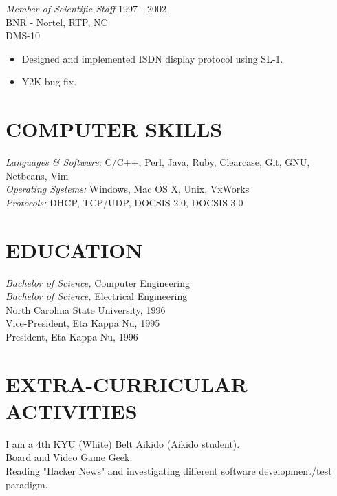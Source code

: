 \documentclass[line,margin]{res}
\begin{document}
\begin{resume}
                {\sl Member of Scientific Staff} \hfill 1997 - 2002 \\
                BNR - Nortel, RTP, NC \\
                DMS-10
                 \begin{itemize}  \itemsep -2pt %
                 \item Designed and implemented ISDN display protocol using SL-1.
                 \item Y2K bug fix.
                 \end{itemize}

 
\section{COMPUTER SKILLS} {\sl Languages \& Software:} C/C++, Perl, Java,
                Ruby, Clearcase, Git, GNU, Netbeans, Vim \\
                {\sl Operating Systems:} Windows, Mac OS X, Unix, VxWorks \\ 
                {\sl Protocols:} DHCP, TCP/UDP, DOCSIS 2.0, DOCSIS 3.0
 
\section{EDUCATION} {\sl Bachelor of Science,} Computer Engineering \\
                    {\sl Bachelor of Science,} Electrical Engineering \\
                North Carolina State University, 1996 \\
                Vice-President, Eta Kappa Nu, 1995 \\ 
                President, Eta Kappa Nu, 1996 \\
 
\section{EXTRA-CURRICULAR ACTIVITIES}             
             I am a 4th KYU (White) Belt Aikido (Aikido student). \\
             Board and Video Game Geek. \\
             Reading "Hacker News" and investigating different software development/test paradigm.

\end{resume}
\end{document}

